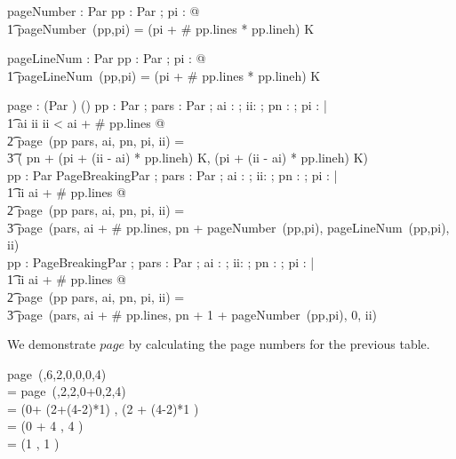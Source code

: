 \documentclass{article}
\begin{document}
\begin{axdef}
	pageNumber : Par \cross \nat \fun \nat
\where
	\forall pp : Par ; pi : \nat @ \\
	\t1 pageNumber~(pp,pi) = (pi + \# pp.lines * pp.lineh) \div K
\end{axdef}

\begin{axdef}
	pageLineNum : Par \cross \nat \fun \nat
\where
	\forall pp : Par ; pi : \nat @ \\
	\t1 pageLineNum~(pp,pi) = (pi + \# pp.lines * pp.lineh) \mod K
\end{axdef}

\begin{axdef}
	page : (\seq Par \cross \nat \cross \nat \cross \nat \cross \nat) \pfun (\nat \cross \nat)
\where
	\forall pp : Par ; pars : \seq Par ; ai : \nat; ii: \nat ; pn : \nat ; pi : \nat | \\
	\t1 ai \leq ii \land ii < ai + \# pp.lines @ \\
	\t2  page~(\langle pp \rangle \cat pars, ai, pn, pi, ii) = \\
	\t3   ( pn + (pi + (ii - ai) * pp.lineh) \div K, (pi + (ii - ai) * pp.lineh) \mod K) \\

	\forall pp : Par \setminus PageBreakingPar ; pars : \seq Par ; ai : \nat ; ii: \nat ; pn : \nat ; pi : \nat | \\
	\t1 ii \geq ai + \# pp.lines @ \\
	\t2  page~(\langle pp \rangle \cat pars, ai, pn, pi, ii) = \\
	\t3   page~(pars, ai + \# pp.lines, pn + pageNumber~(pp,pi), pageLineNum~(pp,pi), ii) \\

	\forall pp : PageBreakingPar ; pars : \seq Par ; ai : \nat ; ii: \nat ; pn : \nat ; pi : \nat | \\
	\t1 ii \geq ai + \# pp.lines @ \\
	\t2  page~(\langle pp \rangle \cat pars, ai, pn, pi, ii) = \\
	\t3   page~(pars, ai + \# pp.lines, pn + 1 + pageNumber~(pp,pi), 0, ii) \\	
\end{axdef}

We demonstrate $page$ by calculating the page numbers for the previous table.

\begin{argue}
page~(,6,2\rangle,0,0,0,4) \\
= page~(,2\rangle,2,0+0,2,4) \\
= (0+ (2+(4-2)*1) , (2 + (4-2)*1 ) \\
= (0 + 4 , 4 ) \\
= (1 , 1 )
\end{argue}
\end{document}
